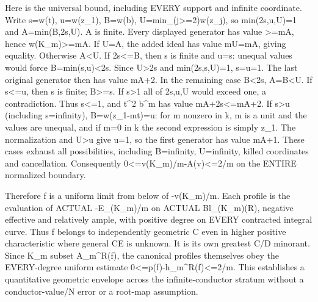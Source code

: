 \documentclass[11pt]{article}
\begin{document}
Here is the universal bound, including EVERY support and infinite coordinate. Write s=w(t), u=w(z\_1), B=w(b), U=min\_(j\textgreater{}=2)w(z\_j), so min(2s,u,U)=1 and A=min(B,2s,U). A is finite. Every displayed generator has value \textgreater{}=mA, hence w(K\_m)\textgreater{}=mA. If U=A, the added ideal has value mU=mA, giving equality. Otherwise A\textless{}U. If 2s\textless{}=B, then s is finite and u=s: unequal values would force B=min(s,u)\textless{}2s. Since U\textgreater{}2s and min(2s,s,U)=1, s=u=1. The last original generator then has value mA+2. In the remaining case B\textless{}2s, A=B\textless{}U. If s\textless{}=u, then s is finite; B\textgreater{}=s. If s\textgreater{}1 all of 2s,u,U would exceed one, a contradiction. Thus s\textless{}=1, and t\textasciicircum{}2 b\textasciicircum{}m has value mA+2s\textless{}=mA+2. If s\textgreater{}u (including s=infinity), B=w(z\_1-mt)=u: for m nonzero in k, m is a unit and the values are unequal, and if m=0 in k the second expression is simply z\_1. The normalization and U\textgreater{}u give u=1, so the first generator has value mA+1. These cases exhaust all possibilities, including B=infinity, U=infinity, killed coordinates and cancellation. Consequently
0\textless{}=v(K\_m)/m-A(v)\textless{}=2/m on the ENTIRE normalized boundary.

Therefore f is a uniform limit from below of -v(K\_m)/m. Each profile is the evaluation of ACTUAL -E\_(K\_m)/m on ACTUAL Bl\_(K\_m)(R), negative effective and relatively ample, with positive degree on EVERY contracted integral curve. Thus f belongs to independently geometric C even in higher positive characteristic where general CE is unknown. It is its own greatest C/D minorant. Since K\_m subset A\_m\textasciicircum{}R(f), the canonical profiles themselves obey the EVERY-degree uniform estimate 0\textless{}=p(f)-h\_m\textasciicircum{}R(f)\textless{}=2/m. This establishes a quantitative geometric envelope across the infinite-conductor stratum without a conductor-value/N error or a root-map assumption.
\end{document}
